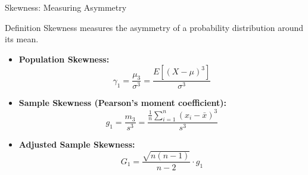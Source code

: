 \documentclass[aspectratio=169,xcolor=dvipsnames,svgnames,x11names,fleqn]{beamer}
\begin{document}
\begin{frame}{Skewness: Measuring Asymmetry}
\begin{block}{Definition}
Skewness measures the asymmetry of a probability distribution around its mean.
\end{block}

\begin{itemize}
    \item \textbf{Population Skewness:}
    $$\gamma_1 = \frac{\mu_3}{\sigma^3} = \frac{E[(X - \mu)^3]}{\sigma^3}$$
    
    \item \textbf{Sample Skewness (Pearson's moment coefficient):}
    $$g_1 = \frac{m_3}{s^3} = \frac{\frac{1}{n}\sum_{i=1}^{n}(x_i - \bar{x})^3}{s^3}$$
    
    \item \textbf{Adjusted Sample Skewness:}
    $$G_1 = \frac{\sqrt{n(n-1)}}{n-2} \cdot g_1$$
\end{itemize}
\end{frame}
\end{document}
